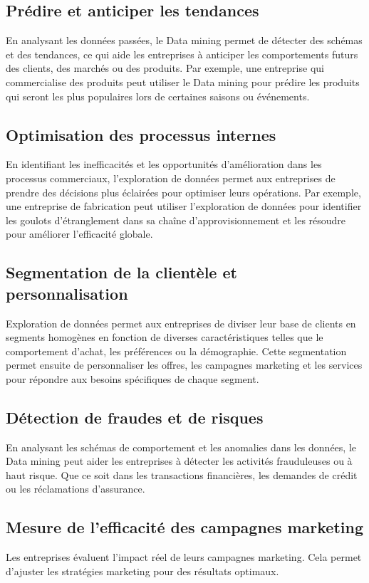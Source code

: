\documentclass[a4paper,12pt]{report}
\begin{document}
        \subsection{Prédire et anticiper les tendances}
            En analysant les données passées, le Data mining permet de détecter des schémas et des tendances, ce qui aide les entreprises à anticiper les comportements futurs des clients, des marchés ou des produits. 
            Par exemple, une entreprise qui commercialise des produits peut utiliser le Data mining pour prédire les produits qui seront les plus populaires lors de certaines saisons ou événements.
        
        \subsection{Optimisation des processus internes}
            En identifiant les inefficacités et les opportunités d'amélioration dans les processus commerciaux, l'exploration de données permet aux entreprises de prendre des décisions plus éclairées pour optimiser leurs opérations. 
            Par exemple, une entreprise de fabrication peut utiliser l'exploration de données pour identifier les goulots d'étranglement dans sa chaîne d'approvisionnement et les résoudre pour améliorer l'efficacité globale.

        \subsection{Segmentation de la clientèle et personnalisation}
            Exploration de données permet aux entreprises de diviser leur base de clients en segments homogènes en fonction de diverses caractéristiques telles que le comportement d'achat, les préférences ou la démographie. Cette segmentation permet ensuite de personnaliser les offres, les campagnes marketing et les services pour répondre aux besoins spécifiques de chaque segment.

        \subsection{Détection de fraudes et de risques}
            En analysant les schémas de comportement et les anomalies dans les données, le Data mining peut aider les entreprises à détecter les activités frauduleuses ou à haut risque. Que ce soit dans les transactions financières, les demandes de crédit ou les réclamations d'assurance.

        \subsection{Mesure de l’efficacité des campagnes marketing}
            Les entreprises évaluent l’impact réel de leurs campagnes marketing. Cela permet d’ajuster les stratégies marketing pour des résultats optimaux.
        
\end{document}
